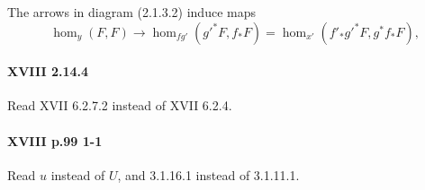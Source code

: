 \documentclass[12pt,oneside,english]{smfbook}
\begin{document}
The arrows in diagram (2.1.3.2) induce maps
\[
  \hom_y(F,F) \to \hom_{f g'}({g'}^\ast F,f_\ast F) = \hom_{x'}(f'_\ast {g'}^\ast F,g^\ast f_\ast F) \text{,}
\]

\paragraph{XVIII 2.14.4}
Read XVII 6.2.7.2 instead of XVII 6.2.4.

\paragraph{XVIII p.99 1-1}
Read $u$ instead of $U$, and 3.1.16.1 instead of 3.1.11.1.
\clearpage

\providecommand{\bysame}{\leavevmode\hbox to3em{\hrulefill}\thinspace} \providecommand{\MR}{\relax\ifhmode\unskip\space\fi MR }
\providecommand{\MRhref}[2]{%
  \href{http://www.ams.org/mathscinet-getitem?mr=#1}{#2} } \providecommand{\href}[2]{#2}
\end{document}
